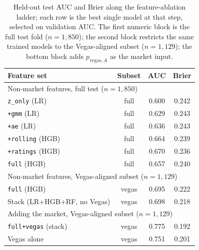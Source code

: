 \documentclass[12pt,oneside]{report}
\begin{document}
\begin{table}[ht]
\centering
\caption{Held-out test AUC and Brier along the feature-ablation
ladder; each row is the best single model at that step, selected on
validation AUC.  The first numeric block is the full test fold
($n = 1{,}850$); the second block restricts the same trained models
to the Vegas-aligned subset ($n = 1{,}129$); the bottom block adds
\(p_{\mathrm{vegas},A}\) as the market input.}
\label{tab:ablation}
\begin{tabular}{lccc}
\toprule
Feature set                & Subset & AUC   & Brier \\
\midrule
\multicolumn{4}{l}{Non-market features, full test (\(n = 1{,}850\))} \\
\texttt{z\_only} (LR)      & full   & 0.600 & 0.242 \\
\texttt{+gmm} (LR)         & full   & 0.629 & 0.243 \\
\texttt{+ae} (LR)          & full   & 0.636 & 0.243 \\
\texttt{+rolling} (HGB)    & full   & 0.664 & 0.239 \\
\texttt{+ratings} (HGB)    & full   & 0.670 & 0.236 \\
\texttt{full} (HGB)        & full   & 0.657 & 0.240 \\
\midrule
\multicolumn{4}{l}{Non-market features, Vegas-aligned subset (\(n = 1{,}129\))} \\
\texttt{full} (HGB)        & vegas  & 0.695 & 0.222 \\
Stack (LR+HGB+RF, no Vegas)& vegas  & 0.698 & 0.218 \\
\midrule
\multicolumn{4}{l}{Adding the market, Vegas-aligned subset (\(n = 1{,}129\))} \\
\texttt{full+vegas} (stack) & vegas & 0.775 & 0.192 \\
Vegas alone                 & vegas & 0.751 & 0.201 \\
\bottomrule
\end{tabular}
\end{table}
\end{document}
